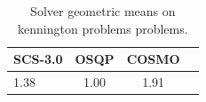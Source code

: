 \begin{table}
\centering
\caption{Solver geometric means on kennington problems problems.}
\label{t-kennington problems-geom_mean}
\begin{tabular}{lccc}
\toprule
 SCS-3.0 &  OSQP &  COSMO \\
\midrule
    1.38 &  1.00 &   1.91 \\
\bottomrule
\end{tabular}
\end{table}
